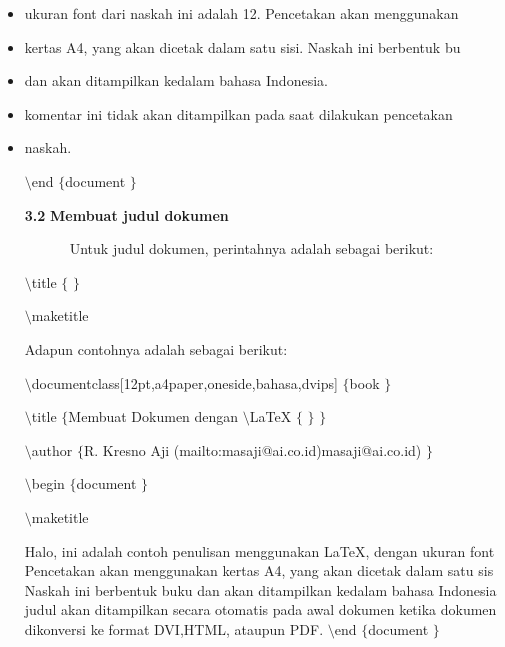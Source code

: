 \begin{itemize}
\item {\fontsize{10pt}{10pt}\selectfont ukuran font dari naskah ini adalah 12. Pencetakan akan menggunakan}
 \par
\item {\fontsize{10pt}{10pt}\selectfont kertas A4, yang akan dicetak dalam satu sisi. Naskah ini berbentuk bu}
 \par
\item {\fontsize{10pt}{10pt}\selectfont dan akan ditampilkan kedalam bahasa Indonesia.}
 \par
\item {\fontsize{10pt}{10pt}\selectfont komentar ini tidak akan ditampilkan pada saat dilakukan pencetakan}
 \par
\item {\fontsize{10pt}{10pt}\selectfont naskah.}
 \par
{\fontsize{10pt}{10pt}\selectfont  $  \setminus  $end $  \{  $document $  \}  $}
 \par
\vspace{10pt}
\textbf{3.2 }\textbf{Membuat judul dokumen}
 \par
\textbf{~~~~~ }\textbf{ }Untuk judul dokumen, perintahnya adalah sebagai berikut:
 \par
{\fontsize{10pt}{10pt}\selectfont  $  \setminus  $title $  \{  $ $  \}  $}
 \par
{\fontsize{10pt}{10pt}\selectfont  $  \setminus  $maketitle}
 \par
\vspace{12pt}
Adapun contohnya adalah sebagai berikut:
 \par
{\fontsize{10pt}{10pt}\selectfont  $  \setminus  $documentclass[12pt,a4paper,oneside,bahasa,dvips] $  \{  $book $  \}  $}
 \par
{\fontsize{10pt}{10pt}\selectfont  $  \setminus  $title $  \{  $Membuat Dokumen dengan  $  \setminus  $LaTeX $  \{  $ $  \}  $ $  \}  $}
 \par
{\fontsize{10pt}{10pt}\selectfont  $  \setminus  $author $  \{  $R. Kresno Aji ({mailto:masaji@ai.co.id)}{masaji@ai.co.id)}
 $  \}  $}
 \par
{\fontsize{10pt}{10pt}\selectfont  $  \setminus  $begin $  \{  $document $  \}  $}
 \par
{\fontsize{10pt}{10pt}\selectfont  $  \setminus  $maketitle}
 \par
\vspace{10pt}
{\fontsize{10pt}{10pt}\selectfont Halo, ini adalah contoh penulisan menggunakan LaTeX, dengan ukuran font Pencetakan akan menggunakan kertas A4, yang akan dicetak dalam satu sis Naskah ini berbentuk buku dan akan ditampilkan kedalam bahasa Indonesia judul akan ditampilkan secara otomatis pada awal dokumen ketika dokumen dikonversi ke format DVI,HTML, ataupun PDF.  $  \setminus  $end $  \{  $document $  \}  $} \par

\end{itemize}
